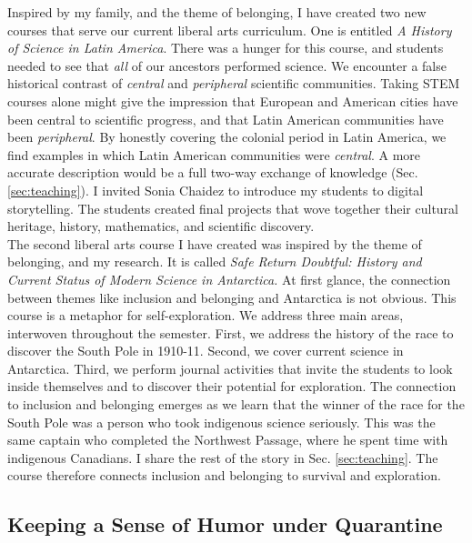 \documentclass[../../main.tex]{subfiles}
\begin{document}
Inspired by my family, and the theme of belonging, I have created two new courses that serve our current liberal arts curriculum.  One is entitled \textit{A History of Science in Latin America}.  There was a hunger for this course, and students needed to see that \textit{all} of our ancestors performed science.  We encounter a false historical contrast of \textit{central} and \textit{peripheral} scientific communities.  Taking STEM courses alone might give the impression that European and American cities have been central to scientific progress, and that Latin American communities have been \textit{peripheral}.  By honestly covering the colonial period in Latin America, we find examples in which Latin American communities were \textit{central}.  A more accurate description would be a full two-way exchange of knowledge (Sec. \ref{sec:teaching}).  I invited Sonia Chaidez to introduce my students to digital storytelling.  The students created final projects that wove together their cultural heritage, history, mathematics, and scientific discovery.
\\
\vspace{0.15cm}
The second liberal arts course I have created was inspired by the theme of belonging, and my research.  It is called \textit{Safe Return Doubtful: History and Current Status of Modern Science in Antarctica.}  At first glance, the connection between themes like inclusion and belonging and Antarctica is not obvious.  This course is a metaphor for self-exploration.  We address three main areas, interwoven throughout the semester.  First, we address the history of the race to discover the South Pole in 1910-11.  Second, we cover current science in Antarctica.  Third, we perform journal activities that invite the students to look inside themselves and to discover their potential for exploration.  The connection to inclusion and belonging emerges as we learn that the winner of the race for the South Pole was a person who took indigenous science seriously.  This was the same captain who completed the Northwest Passage, where he spent time with indigenous Canadians.  I share the rest of the story in Sec. \ref{sec:teaching}.  The course therefore connects inclusion and belonging to survival and exploration.

\subsection{Keeping a Sense of Humor under Quarantine}
\end{document}
